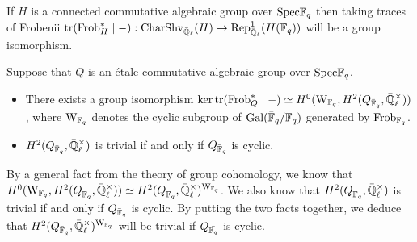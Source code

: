             \begin{lemma} \label{lemma: sheaf_function_correspondence_for_connected_algebraic_groups}
                \cite[Proposition 1.14]{cunningham_roe_function_sheaf_dictionary_quasi_characters_p_adic_tori} If $H$ is a connected commutative algebraic group over $\mathrm{Spec} \mathbb{F}_q$ then taking traces of Frobenii $\operatorname{tr}(\mathrm{Frob}_H^* \mid -): \mathrm{Char}\mathrm{Shv}_{\bar{\mathbb{Q}}_{\ell}}(H) \to \mathrm{Rep}_{\bar{\mathbb{Q}}_{\ell}}^1(H(\mathbb{F}_q))$ will be a group isomorphism.
            \end{lemma}
            \begin{lemma} \label{lemma: sheaf_function_correspondence_for_etale_commutative_group_schemes}
                Suppose that $Q$ is an \'etale commutative algebraic group over $\mathrm{Spec} \mathbb{F}_q$.
                \begin{itemize}
                    \item \cite[Proposition 2.7]{cunningham_roe_function_sheaf_dictionary_quasi_characters_p_adic_tori} There exists a group isomorphism $\ker \trace(\Frob_Q^* \mid -) \cong H^0(\rmW_{\F_q}, H^2(Q_{\bar{\F}_q}, \bar{\Q}_{\ell}^{\x}))$, where $\mathrm{W}_{\mathbb{F}_q}$ denotes the cyclic subgroup of $\mathrm{Gal}(\bar{\mathbb{F}}_q/\mathbb{F}_q)$ generated by $\mathrm{Frob}_{\mathbb{F}_q}$. 
                    \item \cite[Remark 2.9]{cunningham_roe_function_sheaf_dictionary_quasi_characters_p_adic_tori} $H^2(Q_{\bar{\F}_q}, \bar{\Q}_{\ell}^{\x})$ is trivial if and only if $Q_{\bar{\mathbb{F}}_q}$ is cyclic.
                \end{itemize}
            \end{lemma}
            \begin{corollary} \label{coro: kernels_of_traces_of_frobenii_on_etale_group_schemes}
                By a general fact from the theory of group cohomology, we know that $H^0(\rmW_{\F_q}, H^2(Q_{\bar{\F}_q}, \bar{\Q}_{\ell}^{\x})) \cong H^2(Q_{\bar{\F}_q}, \bar{\Q}_{\ell}^{\x})^{\rmW_{\F_q}}$. We also know that $H^2(Q_{\bar{\F}_q}, \bar{\Q}_{\ell}^{\x})$ is trivial if and only if $Q_{\bar{\mathbb{F}}_q}$ is cyclic. By putting the two facts together, we deduce that $H^2(Q_{\bar{\F}_q}, \bar{\Q}_{\ell}^{\x})^{\rmW_{\F_q}}$ will be trivial if $Q_{\bar{\mathbb{F}_q}}$ is cyclic. 
            \end{corollary}
            
